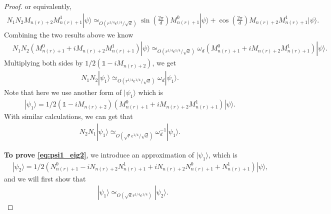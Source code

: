 \documentclass[11pt,letterpaper]{article}
\newcommand{\ket}[1]{|#1\rangle}
\newcommand{\1}{\mathbb{1}}
\newcommand{\nr}{n(r)}
\newcommand{\qe}{\epsilon^{1/4}}
\newcommand{\sd}{\sqrt{d}}
\newcommand{\sr}{\sqrt{r}}
\newcommand{\qr}{r^{1/4}}
\newcommand{\appd}[1]{\simeq_{#1}}
\theoremstyle{definition}
\begin{document}
\begin{proof}
        or equivalently,
        \begin{align*}
        		N_1N_2 M_{\nr+2}M_{\nr+1}^1 \ket{\psi}\appd{O(\qr \qe/\sd)} 
		\sin(\frac{2\pi}{d}) M_{\nr+1}^0\ket{\psi} + \cos(\frac{2\pi}{d})M_{\nr+2}M_{\nr+1}^1\ket{\psi}.
        \end{align*}
        Combining the two results above we know
	\begin{align}
		\label{eq:omegad}
		&N_1N_2 (M_{\nr+1}^0 + i M_{\nr+2}M_{\nr+1}^1) \ket{\psi} 
		\appd{O(\qr \qe/\sd)}\omega_d(M_{\nr+1}^0 + iM_{\nr+2}M_{\nr+1}^1) \ket{\psi}.
	\end{align}
	Multiplying both sides by $1/2(\1 - iM_{\nr+2})$, we get
	\begin{align}
		N_1N_2 \ket{\psi_1} \appd{O(\qr \qe/\sd)} \omega_d\ket{\psi_1}.
	\end{align}
	Note that here we use another form of $\ket{\psi_1}$ which is 
	\begin{align*}
	\ket{\psi_1} = 1/2(\1 - iM_{\nr+2})(M_{\nr+1}^0 + i M_{\nr+2}M_{\nr+1}^1) \ket{\psi}.
	\end{align*}
	With similar calculations, we can get that 
	\begin{align}
	    N_2N_1 \ket{\psi_1} \appd{O(\sr \qe/\sd)} \omega_d^{-1}\ket{\psi_1}.
	\end{align}
	
	\textbf{To prove \cref{eq:psi1_eig2}}, we introduce an approximation of $\ket{\psi_1}$, which is 
	\begin{align}
	    &\ket{\psi_2} =1/2 (N_{\nr+1}^0 - iN_{\nr+2}N_{\nr+1}^1+iN_{\nr+2}N_{\nr+1}^0 + N_{\nr+1}^1)\ket{\psi},
	\end{align}
	and we will first show that 
	\begin{align}
	    \label{eq:psi1_eq} &\ket{\psi_1} \appd{O(\sd \qr\qe)} \ket{\psi_2}.
	\end{align}
	

\end{proof}
\end{document}
